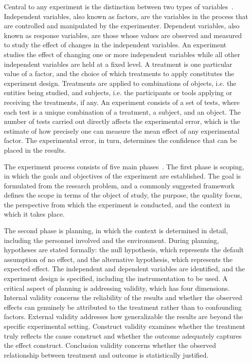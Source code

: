 \documentclass[
english,                 %
bibtex,                  %
includeExtraAbstracts, %
]{kththesis}
\numberwithin{listing}{chapter}
\begin{document}
Central to any experiment is the distinction between two types of variables~\cite{wohlin_experimentation_2024}. Independent variables, also known as factors, are the variables in the process that are controlled and manipulated by the experimenter. Dependent variables, also known as response variables, are those whose values are observed and measured to study the effect of changes in the independent variables. An experiment studies the effect of changing one or more independent variables while all other independent variables are held at a fixed level. A treatment is one particular value of a factor, and the choice of which treatments to apply constitutes the experiment design. Treatments are applied to combinations of objects, i.e. the entities being studied, and subjects, i.e. the participants or tools applying or receiving the treatments, if any. An experiment consists of a set of tests, where each test is a unique combination of a treatment, a subject, and an object. The number of tests carried out directly affects the experimental error, which is the estimate of how precisely one can measure the mean effect of any experimental factor. The experimental error, in turn, determines the confidence that can be placed in the results.

The experiment process consists of five main phases~\cite{wohlin_experimentation_2024}. The first phase is scoping, in which the goals and objectives of the experiment are established. The goal is formulated from the research problem, and a commonly suggested framework defines the scope in terms of the object of study, the purpose, the quality focus, the perspective from which the experiment is conducted, and the context in which it takes place.

The second phase is planning, in which the context is determined in detail, including the personnel involved and the environment. During planning, hypotheses are stated formally: the null hypothesis, which represents the default assumption of no effect, and the alternative hypothesis, which represents the expected effect. The independent and dependent variables are identified, and the experiment design is specified, including the instrumentation to be used. A critical aspect of planning is addressing validity, which has four dimensions. Internal validity concerns the reliability of the results and whether the observed effects can genuinely be attributed to the treatment rather than to confounding factors. External validity addresses how generalizable the results are beyond the specific experimental setting. Construct validity examines whether the treatment truly reflects the cause construct and whether the outcome adequately captures the effect construct. Conclusion validity concerns whether the observed relationship between treatment and outcome is statistically justified.
\end{document}
